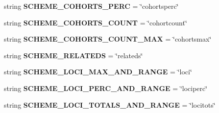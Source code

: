 \begin{DoxyCompactItemize}
\item 
string {\bfseries S\+C\+H\+E\+M\+E\+\_\+\+C\+O\+H\+O\+R\+T\+S\+\_\+\+P\+E\+RC} = \char`\"{}cohortsperc\char`\"{}\hypertarget{namespacenegui_1_1genepopfilesampler_a7f5a5b4d8448a86c851646fbb8d923c6}{}\label{namespacenegui_1_1genepopfilesampler_a7f5a5b4d8448a86c851646fbb8d923c6}

\item 
string {\bfseries S\+C\+H\+E\+M\+E\+\_\+\+C\+O\+H\+O\+R\+T\+S\+\_\+\+C\+O\+U\+NT} = \char`\"{}cohortcount\char`\"{}\hypertarget{namespacenegui_1_1genepopfilesampler_a13294f6978582ac1776ab961dde87450}{}\label{namespacenegui_1_1genepopfilesampler_a13294f6978582ac1776ab961dde87450}

\item 
string {\bfseries S\+C\+H\+E\+M\+E\+\_\+\+C\+O\+H\+O\+R\+T\+S\+\_\+\+C\+O\+U\+N\+T\+\_\+\+M\+AX} = \char`\"{}cohortsmax\char`\"{}\hypertarget{namespacenegui_1_1genepopfilesampler_afb7f50d7955aa133b9cb37a0e0cc0c2e}{}\label{namespacenegui_1_1genepopfilesampler_afb7f50d7955aa133b9cb37a0e0cc0c2e}

\item 
string {\bfseries S\+C\+H\+E\+M\+E\+\_\+\+R\+E\+L\+A\+T\+E\+DS} = \char`\"{}relateds\char`\"{}\hypertarget{namespacenegui_1_1genepopfilesampler_acec997bb8951673a46f30157dd69973e}{}\label{namespacenegui_1_1genepopfilesampler_acec997bb8951673a46f30157dd69973e}

\item 
string {\bfseries S\+C\+H\+E\+M\+E\+\_\+\+L\+O\+C\+I\+\_\+\+M\+A\+X\+\_\+\+A\+N\+D\+\_\+\+R\+A\+N\+GE} = \char`\"{}loci\char`\"{}\hypertarget{namespacenegui_1_1genepopfilesampler_a2c2d4868169126359e5c546ed7cd429c}{}\label{namespacenegui_1_1genepopfilesampler_a2c2d4868169126359e5c546ed7cd429c}

\item 
string {\bfseries S\+C\+H\+E\+M\+E\+\_\+\+L\+O\+C\+I\+\_\+\+P\+E\+R\+C\+\_\+\+A\+N\+D\+\_\+\+R\+A\+N\+GE} = \char`\"{}lociperc\char`\"{}\hypertarget{namespacenegui_1_1genepopfilesampler_a6e83e86e771a30ab2d457bc0f46517cb}{}\label{namespacenegui_1_1genepopfilesampler_a6e83e86e771a30ab2d457bc0f46517cb}

\item 
string {\bfseries S\+C\+H\+E\+M\+E\+\_\+\+L\+O\+C\+I\+\_\+\+T\+O\+T\+A\+L\+S\+\_\+\+A\+N\+D\+\_\+\+R\+A\+N\+GE} = \char`\"{}locitots\char`\"{}\hypertarget{namespacenegui_1_1genepopfilesampler_a673c0970d35fb8481047f33f4da1b096}{}\label{namespacenegui_1_1genepopfilesampler_a673c0970d35fb8481047f33f4da1b096}


\end{DoxyCompactItemize}
